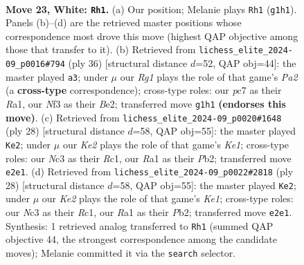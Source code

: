 \documentclass[11pt]{article}
\begin{document}
\clearpage

\begin{figure}[p]\centering
\begin{subfigure}{0.46\textwidth}\centering
\resizebox{\linewidth}{!}{%
\newchessgame
\chessboard[
  setfen={r4r1b/1ppb1k2/p7/n3pp1p/2P5/P1N2N2/1PB1KPP1/R1B3R1 w - - 1 23},
  showmover=false,
  pgfstyle=straightmove, color=movearrow, markmove={g1-h1}
]}
\caption{}
\end{subfigure}\hfill
\begin{subfigure}{0.46\textwidth}\centering
\resizebox{\linewidth}{!}{%
\newchessgame
\chessboard[
  setfen={2k4r/3rbppp/pBb1pn2/1p6/8/2N2P2/PPP1BKPP/R6R w - - 4 19},
  showmover=false,
  pgfstyle=straightmove, color=movearrow, markmove={a2-a3}
]}
\caption{}
\end{subfigure}
\\[4pt]
\begin{subfigure}{0.46\textwidth}\centering
\resizebox{\linewidth}{!}{%
\newchessgame
\chessboard[
  setfen={r4rk1/pp1b1p2/4pp1p/8/1nBN4/4P3/PP3PPP/2R1K2R w K - 1 15},
  showmover=false,
  pgfstyle=straightmove, color=movearrow, markmove={e1-e2}
]}
\caption{}
\end{subfigure}\hfill
\begin{subfigure}{0.46\textwidth}\centering
\resizebox{\linewidth}{!}{%
\newchessgame
\chessboard[
  setfen={r4rk1/pp1b1p2/4pp1p/8/1nBN4/4P3/PP3PPP/2R1K2R w K - 1 15},
  showmover=false,
  pgfstyle=straightmove, color=movearrow, markmove={e1-e2}
]}
\caption{}
\end{subfigure}
\caption{\textbf{Move 23, White: \texttt{Rh1}.} (a) Our position; Melanie plays \texttt{Rh1} (\texttt{g1h1}). Panels (b)--(d) are the retrieved master positions whose correspondence most drove this move (highest QAP objective among those that transfer to it). (b) Retrieved from \texttt{lichess\_elite\_2024-09\_p0016\#794} (ply 36) [structural distance $d$=52, QAP obj=44]: the master played \texttt{a3}; under $\mu$ our \emph{Rg1} plays the role of that game's \emph{Pa2} (a \textbf{cross-type} correspondence); cross-type roles: our \emph{p}c7 as their \emph{R}a1, our \emph{N}f3 as their \emph{B}e2; transferred move \texttt{g1h1} \textbf{(endorses this move)}. (c) Retrieved from \texttt{lichess\_elite\_2024-09\_p0020\#1648} (ply 28) [structural distance $d$=58, QAP obj=55]: the master played \texttt{Ke2}; under $\mu$ our \emph{Ke2} plays the role of that game's \emph{Ke1}; cross-type roles: our \emph{N}c3 as their \emph{R}c1, our \emph{R}a1 as their \emph{P}b2; transferred move \texttt{e2e1}. (d) Retrieved from \texttt{lichess\_elite\_2024-09\_p0022\#2818} (ply 28) [structural distance $d$=58, QAP obj=55]: the master played \texttt{Ke2}; under $\mu$ our \emph{Ke2} plays the role of that game's \emph{Ke1}; cross-type roles: our \emph{N}c3 as their \emph{R}c1, our \emph{R}a1 as their \emph{P}b2; transferred move \texttt{e2e1}. Synthesis: 1 retrieved analog transferred to \texttt{Rh1} (summed QAP objective 44, the strongest correspondence among the candidate moves); Melanie committed it via the \texttt{search} selector.}
\label{fig:thought-m44}
\end{figure}
\end{document}
